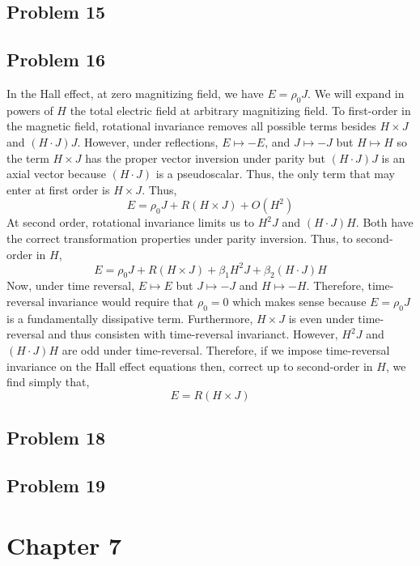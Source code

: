 \documentclass[12pt]{extarticle}
\theoremstyle{definition}
\begin{document}
\subsection{Problem 15}

\subsection{Problem 16}

In the Hall effect, at zero magnitizing field, we have $E = \rho_0 J$. We will expand in powers of $H$ the total electric field at arbitrary magnitizing field. To first-order in the magnetic field, rotational invariance removes all possible terms besides $H \times J$ and $(H \cdot J)J$. However, under reflections, $E \mapsto - E$, and $J \mapsto - J$ but $H \mapsto H$ so the term $H \times J$ has the proper vector inversion under parity but $(H \cdot J) J$ is an axial vector because $(H \cdot J)$ is a pseudoscalar. Thus, the only term that may enter at first order is $H \times J$. Thus,
\[ E = \rho_0 J + R (H \times J) + O(H^2) \]
At second order, rotational invariance limits us to $H^2 J$ and $(H \cdot J)H$. Both have the correct transformation properties under parity inversion. Thus, to second-order in $H$,
\[ E = \rho_0 J + R (H \times J) + \beta_1 H^2 J + \beta_2 (H \cdot J) H \]
Now, under time reversal, $E \mapsto E$ but $J \mapsto - J$ and $H \mapsto - H$. Therefore, time-reversal invariance would require that $\rho_0 = 0$ which makes sense because $E = \rho_0 J$ is a fundamentally dissipative term. Furthermore, $H \times J$ is even under time-reversal and thus consisten with time-reversal invarianct. However, $H^2 J$ and $(H \cdot J) H$ are odd under time-reversal. Therefore, if we impose time-reversal invariance on the Hall effect equations then, correct up to second-order in $H$, we find simply that,
\[ E = R(H \times J) \] 

\subsection{Problem 18}

\subsection{Problem 19}


\section{Chapter 7}
\end{document}
